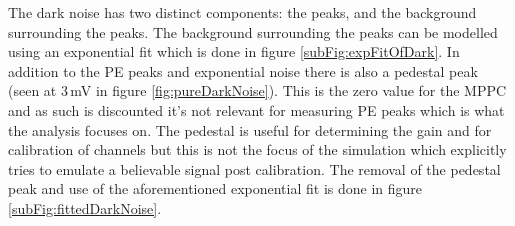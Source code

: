 The dark noise has two distinct components: the peaks, and the background surrounding the peaks. The background surrounding the peaks can be modelled using an exponential fit which is done in figure \ref{subFig:expFitOfDark}. In addition to the PE peaks and exponential noise there is also a pedestal peak (seen at 3\,mV in figure \ref{fig:pureDarkNoise}). This is the zero value for the MPPC and as such is discounted it's not relevant for measuring PE peaks which is what the analysis focuses on. The pedestal is useful for determining the gain and for calibration of channels but this is not the focus of the simulation which explicitly tries to emulate a believable signal post calibration. The removal of the pedestal peak and use of the aforementioned exponential fit is done in figure \ref{subFig:fittedDarkNoise}.
